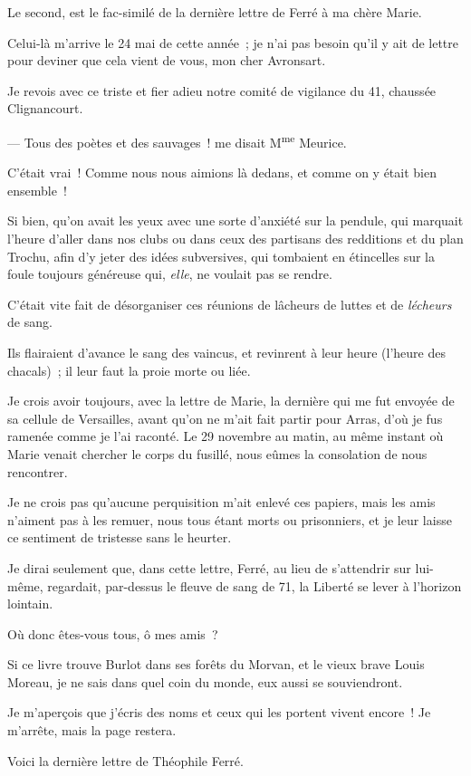 \documentclass[french,twoside]{book} %
\begin{document}
\noindent Le second, est le fac-similé de la dernière lettre de Ferré à ma chère Marie.\par
Celui-là m’arrive le 24 mai de cette année ; je n’ai pas besoin qu’il y ait de lettre pour deviner que cela vient de vous, mon cher Avronsart.\par
Je revois avec ce triste et fier adieu notre comité de vigilance du 41, chaussée Clignancourt.\par
— Tous des poètes et des sauvages ! me disait M\textsuperscript{me} Meurice.\par
C’était vrai ! Comme nous nous aimions là dedans, et comme on y était bien ensemble !\par
Si bien, qu’on avait les yeux avec une sorte d’anxiété sur la pendule, qui marquait l’heure d’aller dans nos clubs ou dans ceux des partisans des redditions et du plan Trochu, afin d’y jeter des idées subversives, qui tombaient en étincelles sur la foule toujours généreuse qui, \emph{elle}, ne voulait pas se rendre.\par
 C’était vite fait de désorganiser ces réunions de lâcheurs de luttes et de \emph{lécheurs} de sang.\par
Ils flairaient d’avance le sang des vaincus, et revinrent à leur heure (l’heure des chacals) ; il leur faut la proie morte ou liée.\par
Je crois avoir toujours, avec la lettre de Marie, la dernière qui me fut envoyée de sa cellule de Versailles, avant qu’on ne m’ait fait partir pour Arras, d’où je fus ramenée comme je l’ai raconté. Le 29 novembre au matin, au même instant où Marie venait chercher le corps du fusillé, nous eûmes la consolation de nous rencontrer.\par
Je ne crois pas qu’aucune perquisition m’ait enlevé ces papiers, mais les amis n’aiment pas à les remuer, nous tous étant morts ou prisonniers, et je leur laisse ce sentiment de tristesse sans le heurter.\par
Je dirai seulement que, dans cette lettre, Ferré, au lieu de s’attendrir sur lui-même, regardait, par-dessus le fleuve de sang de 71, la Liberté se lever à l’horizon lointain.\par
Où donc êtes-vous tous, ô mes amis ?\par
Si ce livre trouve Burlot dans ses forêts du Morvan, et le vieux brave Louis Moreau, je ne sais dans quel coin du monde, eux aussi se souviendront.\par
Je m’aperçois que j’écris des noms et ceux qui  les portent vivent encore ! Je m’arrête, mais la page restera.\par
Voici la dernière lettre de Théophile Ferré.\par
\end{document}
